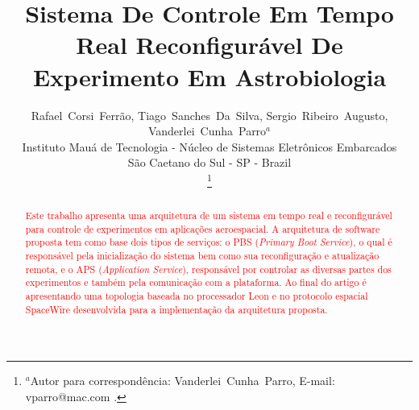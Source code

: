 \documentclass[journal,a4paper,oneside,twocolumn]{IEEEtran}
\begin{document}
%
\title{ Sistema De Controle Em Tempo Real Reconfigur\'{a}vel De 
		Experimento Em Astrobiologia }

\author{
		Rafael~Corsi~Ferr\~{a}o, 
        Tiago~Sanches~Da~Silva,
        Sergio~Ribeiro~Augusto,
        Vanderlei~Cunha~Parro$^{a}$ 
        \\%
        Instituto Mau\'{a} de Tecnologia -  N\'{u}cleo de Sistemas Eletr\^{o}nicos Embarcados \\
        S\~{a}o Caetano do Sul - SP - Brazil 
        
\thanks{ $^{a}$Autor para correspondência: Vanderlei~Cunha~Parro, E-mail: vparro@mac.com .}%
}




\maketitle


\begin{abstract}
	\textcolor{red}{ Este trabalho apresenta uma arquitetura de um sistema em tempo real e reconfigurável para controle de experimentos em aplicações aeroespacial. A arquitetura de software proposta tem como base dois tipos de serviços: o PBS (\textit{Primary Boot Service}), o qual é responsável pela inicialização do sistema bem como sua reconfiguração e atualização remota, e o APS (\textit{Application Service}), responsável por controlar as diversas partes dos  experimentos e também pela comunicação com a plataforma. Ao  final do artigo é apresentando uma topologia baseada no processador Leon e no protocolo espacial SpaceWire desenvolvida para a implementação da arquitetura proposta.}
	
\end{abstract}
\end{document}
